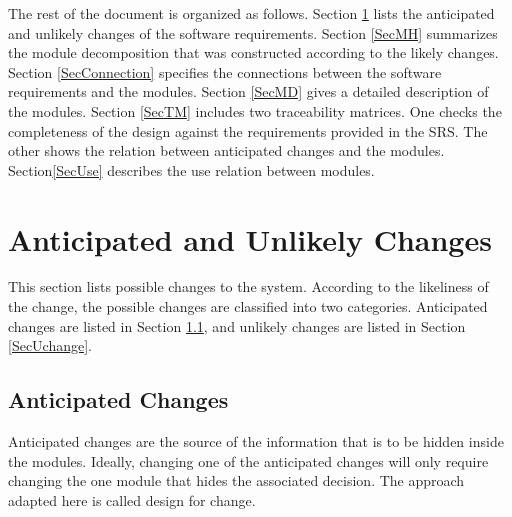 \documentclass[12pt, titlepage]{article}
\begin{document}
The rest of the document is organized as follows. Section
\ref{SecChange} lists the anticipated and unlikely changes of the software
requirements. Section \ref{SecMH} summarizes the module decomposition that
was constructed according to the likely changes. Section \ref{SecConnection}
specifies the connections between the software requirements and the
modules. Section \ref{SecMD} gives a detailed description of the
modules. Section \ref{SecTM} includes two traceability matrices. One checks
the completeness of the design against the requirements provided in the SRS.
The other shows the relation between anticipated changes and the modules.
Section\ref{SecUse} describes the use relation between modules.

\section{Anticipated and Unlikely Changes} \label{SecChange}

This section lists possible changes to the system. According to the likeliness
of the change, the possible changes are classified into two
categories. Anticipated changes are listed in Section \ref{SecAchange}, and
unlikely changes are listed in Section \ref{SecUchange}.

\subsection{Anticipated Changes} \label{SecAchange}

Anticipated changes are the source of the information that is to be hidden
inside the modules. Ideally, changing one of the anticipated changes will only
require changing the one module that hides the associated decision. The
approach adapted here is called design for
change.
\end{document}
